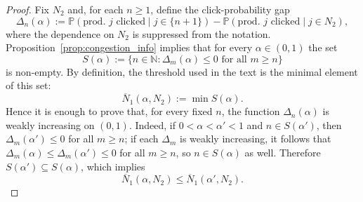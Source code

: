 \documentclass[11pt]{article}
\theoremstyle{plain}
\theoremstyle{definition}
\theoremstyle{plain}
\theoremstyle{plain}
\theoremstyle{plain}
\theoremstyle{plain}
\numberwithin{equation}{section}
\begin{document}
\begin{proof}
Fix $N_2$ and, for each $n \geq 1$, define the click-probability gap
\begin{equation*}
    \Delta_n(\alpha) := \mathbb{P}(\text{prod.\ } j \text{ clicked} \mid j \in \{n+1\}) - \mathbb{P}(\text{prod.\ } j \text{ clicked} \mid j \in N_2),
\end{equation*}
where the dependence on $N_2$ is suppressed from the notation. Proposition~\ref{prop:congestion_info} implies that for every $\alpha \in (0,1)$ the set
\begin{equation*}
    S(\alpha) := \{n \in \mathbb{N} : \Delta_m(\alpha) \leq 0 \text{ for all } m \geq n\}
\end{equation*}
is non-empty. By definition, the threshold used in the text is the minimal element of this set:
\begin{equation*}
    \overline{N}_1(\alpha, N_2) := \min S(\alpha).
\end{equation*}
Hence it is enough to prove that, for every fixed $n$, the function $\Delta_n(\alpha)$ is weakly increasing on $(0,1)$. Indeed, if $0 < \alpha < \alpha' < 1$ and $n \in S(\alpha')$, then $\Delta_m(\alpha') \leq 0$ for all $m \geq n$; if each $\Delta_m$ is weakly increasing, it follows that $\Delta_m(\alpha) \leq \Delta_m(\alpha') \leq 0$ for all $m \geq n$, so $n \in S(\alpha)$ as well. Therefore $S(\alpha') \subseteq S(\alpha)$, which implies
\begin{equation*}
    \overline{N}_1(\alpha, N_2) \leq \overline{N}_1(\alpha', N_2).
\end{equation*}

\vspace{2mm}


\end{proof}
\end{document}
